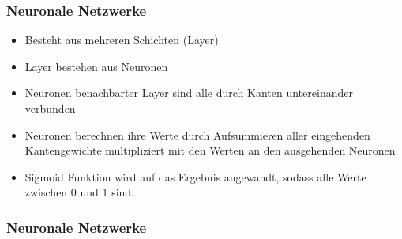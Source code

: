 \begin{frame}
    \frametitle{Neuronale Netzwerke}
    \begin{itemize}
        \item Besteht aus mehreren Schichten (Layer)
        \item Layer bestehen aus Neuronen
        \item Neuronen benachbarter Layer sind alle durch Kanten untereinander verbunden
        \item Neuronen berechnen ihre Werte durch Aufsummieren aller eingehenden Kantengewichte multipliziert mit den Werten an den ausgehenden Neuronen
        \item Sigmoid Funktion wird auf das Ergebnis angewandt, sodass alle Werte zwischen 0 und 1 sind.
    \end{itemize}
\end{frame}

\begin{frame}
    \frametitle{Neuronale Netzwerke}
    \begin{figure}
        \centering
        
        \label{fig:nnet}
    \end{figure}
\end{frame}
